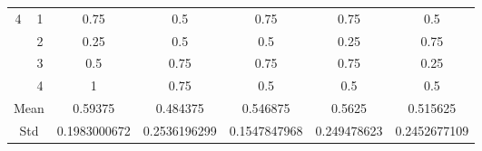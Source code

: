 \documentclass[draft,dvipsnames]{drexel-thesis}
\begin{document}
\begin{thesis}
\begin{table}[!t]
\begin{tabular}{|c|c|c|c|c|c|c|}
\multirow{4}{*}{4}    & 1                   & 0.75         & 0.5          & 0.75         & 0.75        & 0.5          \\ \cline{2-7}
                      & 2                   & 0.25         & 0.5          & 0.5          & 0.25        & 0.75         \\ \cline{2-7}
                      & 3                   & 0.5          & 0.75         & 0.75         & 0.75        & 0.25         \\ \cline{2-7}
                      & 4                   & 1            & 0.75         & 0.5          & 0.5         & 0.5          \\ \hline
\multicolumn{2}{|c|}{Mean}                  & 0.59375      & 0.484375     & 0.546875     & 0.5625      & 0.515625     \\ \hline
\multicolumn{2}{|c|}{Std}                   & 0.1983000672 & 0.2536196299 & 0.1547847968 & 0.249478623 & 0.2452677109 \\ \hline
\end{tabular}
\end{table}


\end{thesis}
\end{document}
